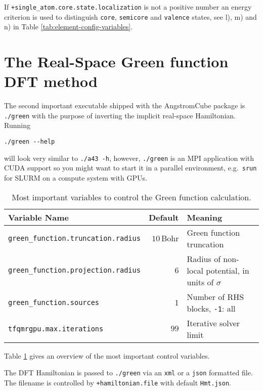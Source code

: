 \documentclass[oribibl]{llncs}
\newcommand{\ttt}[1]{\texttt{#1}}
\newcommand{\fullcodename}{AngstromCube}
\begin{document}
%
If \ttt{+single\_atom.core.state.localization} is not a positive number
an energy criterion is used to distinguish \ttt{core}, \ttt{semicore} and \ttt{valence} states, see l), m) and n) in Table \ref{tab:element-config-variables}.












\cleardoublepage
\newpage

\section{The Real-Space Green function DFT method} \label{sec:green}

The second important executable shipped with the \fullcodename{} package is \ttt{./green}
with the purpose of inverting the implicit real-space Hamiltonian. Running
\begin{verbatim}
./green --help
\end{verbatim}
will look very similar to \ttt{./a43 -h}, however, \ttt{./green} is an \ac{MPI} application
with CUDA support so you might want to start it in a parallel environment, e.g.~\ttt{srun} for SLURM
on a compute system with \ac{GPU}s.

%
\begin{table}[h]
\caption[Main Variables]{
Most important variables to control the Green function calculation.
} \label{tab:main-green-variables}
\centering
\begin{tabular}{|l|r|l|}
\hline
  Variable Name & Default & Meaning \\
\hline
  \ttt{green\_function.truncation.radius} & $10\,$Bohr   & Green function truncation \\
  \ttt{green\_function.projection.radius} & $6$          & Radius of non-local potential, in units of $\sigma$ \\
  \ttt{green\_function.sources}			  & 1            & Number of \ac{RHS} blocks, \ttt{-1}: all \\
  \ttt{tfqmrgpu.max.iterations}           & $99$         & Iterative solver limit \\
\hline
\end{tabular}
\end{table}
%
\noindent
Table \ref{tab:main-green-variables} gives an overview of the most important control variables.

\noindent
The \ac{DFT} Hamiltonian is passed to \ttt{./green} via an \ttt{xml} or a \ttt{json} formatted file.
The filename is controlled by \ttt{+hamiltonian.file} with default \ttt{Hmt.json}.
\end{document}
